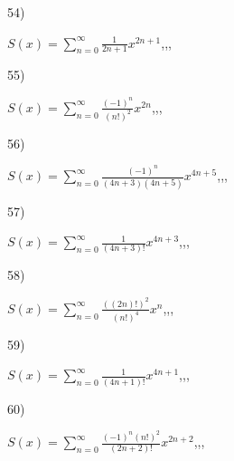 \documentclass[11pt, ukrainian]{article}
\begin{document}
\par
\vspace{0.9cm}
54) \space 
{%
{$S(x)=\sum\limits_{n=0}^{\infty}{\frac{1}{2n+1}}{x^{{2n+1}}}$},,, \par \smallskip  
}
\par
\vspace{0.9cm}
55) \space 
{%
{$S(x)=\sum\limits_{n=0}^{\infty}{\frac{(-1)^n}{(n!)^2}}{x^{{2n}}}$},,, \par \smallskip  
}
\par
\vspace{0.9cm}
56) \space 
{%
{$S(x)=\sum\limits_{n=0}^{\infty}{\frac{(-1)^n}{(4n+3)(4n+5)}}{x^{{4n+5}}}$},,, \par \smallskip  
}
\par
\vspace{0.9cm}
57) \space 
{%
{$S(x)=\sum\limits_{n=0}^{\infty}{\frac{1}{(4n+3)!}}{x^{{4n+3}}}$},,, \par \smallskip  
}
\par
\vspace{0.9cm}
58) \space 
{%
{$S(x)=\sum\limits_{n=0}^{\infty}{\frac{((2n)!)^2}{(n!)^4}}{x^{{n}}}$},,, \par \smallskip  
}
\par
\vspace{0.9cm}
59) \space 
{%
{$S(x)=\sum\limits_{n=0}^{\infty}{\frac{1}{(4n+1)!}}{x^{{4n+1}}}$},,, \par \smallskip  
}
\par
\vspace{0.9cm}
60) \space 
{%
{$S(x)=\sum\limits_{n=0}^{\infty}{\frac{{(-1)^n}{(n!)^2}}{(2n+2)!}}{x^{{2n+2}}}$},,, \par \smallskip  
}
\par
\end{document}

